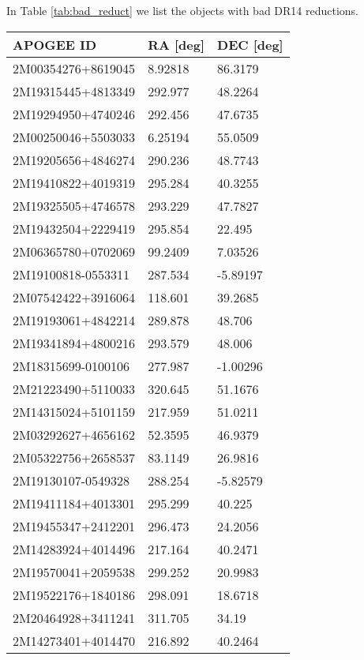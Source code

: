 \documentclass[fleqn,usenatbib]{mnras}
\begin{document}
In Table \ref{tab:bad_reduct} we list the objects with bad DR14 reductions.

\begin{table}
\centering
  \begin{tabular}{lll}
  \toprule
  APOGEE ID  &       RA [deg] &       DEC [deg]                                     \\
  \midrule
2M00354276+8619045 &  8.92818 &   86.3179 \\
2M19315445+4813349 &  292.977 &   48.2264 \\
2M19294950+4740246 &  292.456 &   47.6735 \\
2M00250046+5503033 &  6.25194 &   55.0509 \\
2M19205656+4846274 &  290.236 &   48.7743 \\
2M19410822+4019319 &  295.284 &   40.3255 \\
2M19325505+4746578 &  293.229 &   47.7827 \\
2M19432504+2229419 &  295.854 &    22.495 \\
2M06365780+0702069 &  99.2409 &   7.03526 \\
2M19100818-0553311 &  287.534 &  -5.89197 \\
2M07542422+3916064 &  118.601 &   39.2685 \\
2M19193061+4842214 &  289.878 &    48.706 \\
2M19341894+4800216 &  293.579 &    48.006 \\
2M18315699-0100106 &  277.987 &  -1.00296 \\
2M21223490+5110033 &  320.645 &   51.1676 \\
2M14315024+5101159 &  217.959 &   51.0211 \\
2M03292627+4656162 &  52.3595 &   46.9379 \\
2M05322756+2658537 &  83.1149 &   26.9816 \\
2M19130107-0549328 &  288.254 &  -5.82579 \\
2M19411184+4013301 &  295.299 &    40.225 \\
2M19455347+2412201 &  296.473 &   24.2056 \\
2M14283924+4014496 &  217.164 &   40.2471 \\
2M19570041+2059538 &  299.252 &   20.9983 \\
2M19522176+1840186 &  298.091 &   18.6718 \\
2M20464928+3411241 &  311.705 &     34.19 \\
2M14273401+4014470 &  216.892 &   40.2464 \\

\end{tabular}
\end{table}
\end{document}
